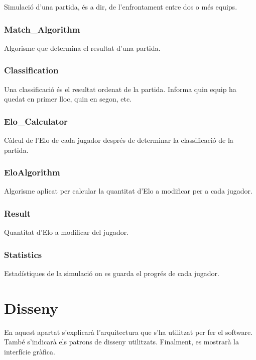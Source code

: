 \documentclass[a4paper]{article}
\begin{document}
Simulació d'una partida, és a dir, de l'enfrontament entre dos o més equips.

\subsubsection*{Match\_Algorithm}

Algorisme que determina el resultat d'una partida.

\subsubsection*{Classification}

Una classificació és el resultat ordenat de la partida. Informa quin equip ha quedat en primer lloc, quin en segon, etc.

\subsubsection*{Elo\_Calculator}

Càlcul de l'Elo de cada jugador després de determinar la classificació de la partida.

\subsubsection*{EloAlgorithm}

Algorisme aplicat per calcular la quantitat d'Elo a modificar per a cada jugador.

\subsubsection*{Result}

Quantitat d'Elo a modificar del jugador.

\subsubsection*{Statistics}

Estadístiques de la simulació on es guarda el progrés de cada jugador.

\newpage
\section{Disseny}

En aquest apartat s'explicarà l'arquitectura que s'ha utilitzat per fer el software. També s'indicarà els patrons de disseny utilitzats. Finalment, es mostrarà la interfície gràfica.
\end{document}

